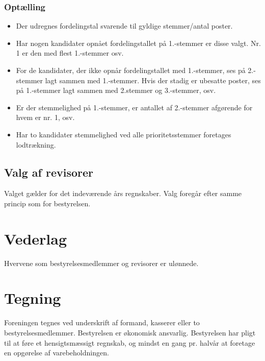 \documentclass[a4paper, 10pt]{article}
\begin{document}
\subsubsection*{Optælling}

\begin{itemize}

\item Der udregnes fordelingstal svarende til gyldige stemmer/antal poster.

\item Har nogen kandidater opnået fordelingstallet på 1.-stemmer er disse
valgt. Nr. 1 er den med flest 1.-stemmer osv.

\item For de kandidater, der ikke opnår fordelingstallet med
1.-stemmer, ses på 2.-stemmer lagt sammen med 1.-stemmer. Hvis der
stadig er ubesatte poster, ses på 1.-stemmer lagt sammen med 2.stemmer
og 3.-stemmer, osv.

\item Er der stemmelighed på 1.-stemmer, er antallet af 2.-stemmer
afgørende for hvem er nr.  1, osv.

\item Har to kandidater stemmelighed ved alle prioritetsstemmer
foretages lodtrækning.

\end{itemize}

\subsection*{Valg af revisorer}

Valget gælder for det indeværende års regnskaber. Valg foregår efter
samme princip som for bestyrelsen.

\section{Vederlag}

Hvervene som bestyrelsesmedlemmer og revisorer er ulønnede.

\section{Tegning}

Foreningen tegnes ved underskrift af formand, kasserer eller to
bestyrelsesmedlemmer. Be\-styrelsen er økonomisk ansvarlig.
Bestyrelsen har pligt til at føre et hensigtsmæssigt regnskab, og
mindst en gang pr. halvår at foretage en opgørelse af
varebeholdningen.
\end{document}
